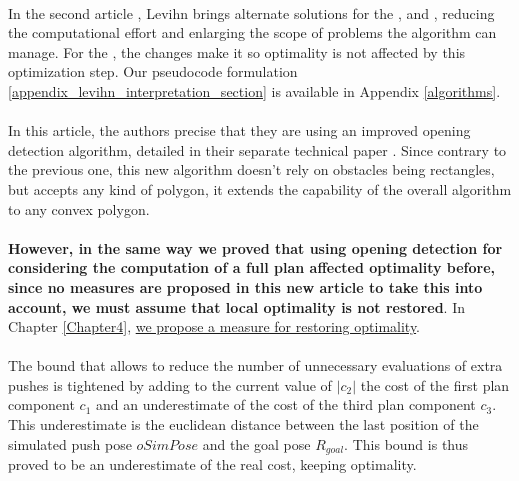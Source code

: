\paragraph{} In the second article \parencite{levihn_locally_2014}, Levihn brings alternate solutions for the ,  and , reducing the computational effort and enlarging the scope of problems the algorithm can manage. For the , the changes make it so optimality is not affected by this optimization step. Our pseudocode formulation \ref{appendix_levihn_interpretation_section} is available in Appendix \ref{algorithms}.

\paragraph{} In this article, the authors precise that they are using an improved opening detection algorithm, detailed in their separate technical paper \parencite{levihn_efficient_2011}. Since contrary to the previous one, this new algorithm doesn't rely on obstacles being rectangles, but accepts any kind of polygon, it extends the capability of the overall algorithm to any convex polygon.

\paragraph{} \textbf{However, in the same way we proved that using opening detection for considering the computation of a full plan affected optimality before, since no measures are proposed in this new article to take this into account, we must assume that local optimality is not restored}. In Chapter \ref{Chapter4}, \hyperref[check_opening_solution]{we propose a measure for restoring optimality}.

\paragraph{} The bound that allows to reduce the number of unnecessary evaluations of extra pushes is tightened by adding to the current value of $|c_{2}|$ the cost of the first plan component $c_{1}$ and an underestimate of the cost of the third plan component $c_{3}$. This underestimate is the euclidean distance between the last position of the simulated push pose $oSimPose$ and the goal pose $R_{goal}$. This bound is thus proved to be an underestimate of the real cost, keeping optimality.

